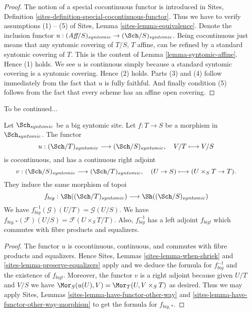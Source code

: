 \begin{proof}
The notion of a special cocontinuous functor is introduced in
Sites, Definition \ref{sites-definition-special-cocontinuous-functor}.
Thus we have to verify assumptions (1) -- (5) of
Sites, Lemma \ref{sites-lemma-equivalence}.
Denote the inclusion functor
$u : (\textit{Aff}/S)_{syntomic} \to (\Sch/S)_{syntomic}$.
Being cocontinuous just means that any syntomic covering of
$T/S$, $T$ affine, can be refined by a standard syntomic covering of $T$.
This is the content of
Lemma \ref{lemma-syntomic-affine}.
Hence (1) holds. We see $u$ is continuous simply because a standard
syntomic covering is a syntomic covering. Hence (2) holds.
Parts (3) and (4) follow immediately from the fact that $u$ is
fully faithful. And finally condition (5) follows from the
fact that every scheme has an affine open covering.
\end{proof}

\noindent
To be continued...

\begin{lemma}
\label{lemma-morphism-big-syntomic}
Let $\Sch_{syntomic}$ be a big syntomic site.
Let $f : T \to S$ be a morphism in $\Sch_{syntomic}$.
The functor
$$
u : (\Sch/T)_{syntomic} \longrightarrow (\Sch/S)_{syntomic},
\quad
V/T \longmapsto V/S
$$
is cocontinuous, and has a continuous right adjoint
$$
v : (\Sch/S)_{syntomic} \longrightarrow (\Sch/T)_{syntomic},
\quad
(U \to S) \longmapsto (U \times_S T \to T).
$$
They induce the same morphism of topoi
$$
f_{big} :
\Sh((\Sch/T)_{syntomic})
\longrightarrow
\Sh((\Sch/S)_{syntomic})
$$
We have $f_{big}^{-1}(\mathcal{G})(U/T) = \mathcal{G}(U/S)$.
We have $f_{big, *}(\mathcal{F})(U/S) = \mathcal{F}(U \times_S T/T)$.
Also, $f_{big}^{-1}$ has a left adjoint $f_{big!}$ which commutes with
fibre products and equalizers.
\end{lemma}

\begin{proof}
The functor $u$ is cocontinuous, continuous, and commutes with fibre products
and equalizers. Hence
Sites, Lemmas \ref{sites-lemma-when-shriek} and
\ref{sites-lemma-preserve-equalizers}
apply and we deduce the formula
for $f_{big}^{-1}$ and the existence of $f_{big!}$. Moreover,
the functor $v$ is a right adjoint because given $U/T$ and $V/S$
we have $\Mor_S(u(U), V) = \Mor_T(U, V \times_S T)$
as desired. Thus we may apply
Sites, Lemmas \ref{sites-lemma-have-functor-other-way} and
\ref{sites-lemma-have-functor-other-way-morphism} to get the
formula for $f_{big, *}$.
\end{proof}













